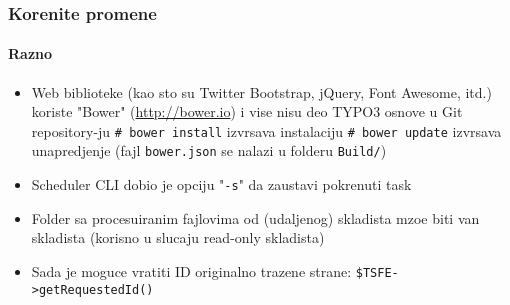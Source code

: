 \begin{frame}[fragile]
	\frametitle{Korenite promene}
	\framesubtitle{Razno}

	\begin{itemize}

		\item Web biblioteke (kao sto su Twitter Bootstrap, jQuery, Font Awesome, itd.) koriste
			"Bower" (\url{http://bower.io}) i vise nisu deo TYPO3 osnove u Git repository-ju\newline
			\small
				\texttt{\# bower install}	\tabto{3.4cm}izvrsava instalaciju\newline
				\texttt{\# bower update}		\tabto{3.4cm}izvrsava unapredjenje\newline
			\normalsize
			(fajl \texttt{bower.json} se nalazi u folderu \texttt{Build/})

		\item Scheduler CLI dobio je opciju "\texttt{-s}" da zaustavi pokrenuti task

		\item Folder sa procesuiranim fajlovima od (udaljenog) skladista mzoe biti van skladista (korisno u slucaju read-only skladista)

		\item Sada je moguce vratiti ID originalno trazene strane:
			\texttt{\$TSFE->getRequestedId()}

	\end{itemize}

\end{frame}

